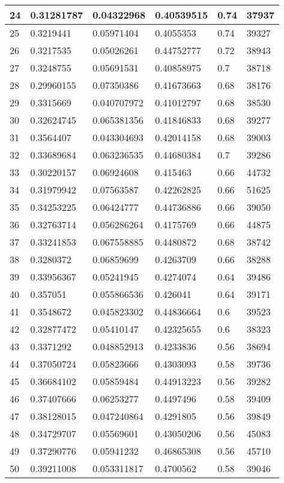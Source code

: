\begin{longtable}{|l|l|l|l|l|l|}
24 & 0.31281787 & 0.04322968 & 0.40539515 & 0.74 & 37937 \\ \hline 
25 & 0.3219441 & 0.05971404 & 0.4055353 & 0.74 & 39327 \\ \hline 
26 & 0.3217535 & 0.05026261 & 0.44752777 & 0.72 & 38943 \\ \hline 
27 & 0.3248755 & 0.05691531 & 0.40858975 & 0.7 & 38718 \\ \hline 
28 & 0.29960155 & 0.07350386 & 0.41673663 & 0.68 & 38176 \\ \hline 
29 & 0.3315669 & 0.040707972 & 0.41012797 & 0.68 & 38530 \\ \hline 
30 & 0.32624745 & 0.065381356 & 0.41846833 & 0.68 & 39277 \\ \hline 
31 & 0.3564407 & 0.043304693 & 0.42014158 & 0.68 & 39003 \\ \hline 
32 & 0.33689684 & 0.063236535 & 0.44680384 & 0.7 & 39286 \\ \hline 
33 & 0.30220157 & 0.06924608 & 0.415463 & 0.66 & 44732 \\ \hline 
34 & 0.31979942 & 0.07563587 & 0.42262825 & 0.66 & 51625 \\ \hline 
35 & 0.34253225 & 0.06424777 & 0.44736886 & 0.66 & 39050 \\ \hline 
36 & 0.32763714 & 0.056286264 & 0.4175769 & 0.66 & 44875 \\ \hline 
37 & 0.33241853 & 0.067558885 & 0.4480872 & 0.68 & 38742 \\ \hline 
38 & 0.3280372 & 0.06859699 & 0.4263709 & 0.66 & 38288 \\ \hline 
39 & 0.33956367 & 0.05241945 & 0.4274074 & 0.64 & 39486 \\ \hline 
40 & 0.357051 & 0.055866536 & 0.426041 & 0.64 & 39171 \\ \hline 
41 & 0.3548672 & 0.045823302 & 0.44836664 & 0.6 & 39523 \\ \hline 
42 & 0.32877472 & 0.05410147 & 0.42325655 & 0.6 & 38323 \\ \hline 
43 & 0.3371292 & 0.048852913 & 0.4233836 & 0.56 & 38694 \\ \hline 
44 & 0.37050724 & 0.05823666 & 0.4303093 & 0.58 & 39736 \\ \hline 
45 & 0.36684102 & 0.05859484 & 0.44913223 & 0.56 & 39282 \\ \hline 
46 & 0.37407666 & 0.06253277 & 0.4497496 & 0.58 & 39409 \\ \hline 
47 & 0.38128015 & 0.047240864 & 0.4291805 & 0.56 & 39849 \\ \hline 
48 & 0.34729707 & 0.05569601 & 0.43050206 & 0.56 & 45083 \\ \hline 
49 & 0.37290776 & 0.05941232 & 0.46865308 & 0.56 & 45710 \\ \hline 
50 & 0.39211008 & 0.053311817 & 0.4700562 & 0.58 & 39046 \\ \hline 
\end{longtable}